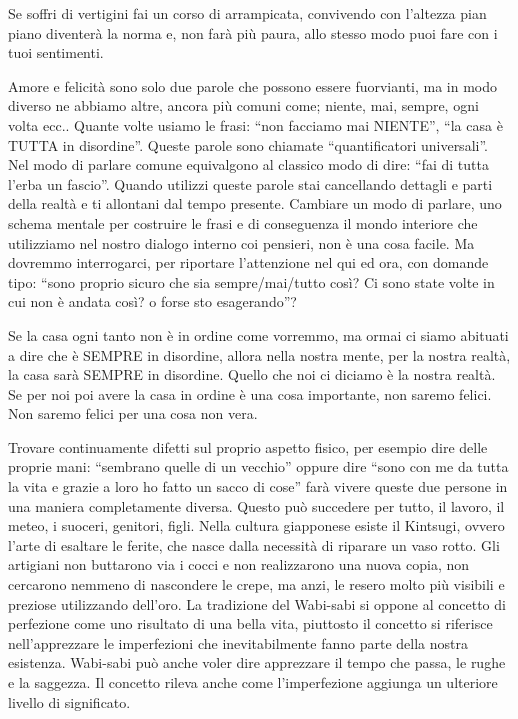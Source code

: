 \documentclass[12pt]{book} %
\begin{document}
Se soffri di vertigini fai un corso di arrampicata, convivendo con l'altezza pian piano diventerà
la norma e, non farà più paura, allo stesso modo puoi fare con i tuoi sentimenti.


\bigskip

Amore e felicità sono solo due parole che possono essere fuorvianti, ma in modo diverso ne abbiamo altre, ancora più
comuni come; niente, mai, sempre, ogni volta ecc.. Quante volte usiamo le frasi: “non facciamo mai NIENTE”, “la casa è
TUTTA in disordine”. Queste parole sono chiamate “quantificatori universali”. Nel modo di parlare comune equivalgono al
classico modo di dire: “fai di tutta l'erba un fascio”. Quando utilizzi queste parole stai
cancellando dettagli e parti della realtà e ti allontani dal tempo presente. Cambiare un modo di parlare, uno schema
mentale per costruire le frasi e di conseguenza il mondo interiore che utilizziamo nel nostro dialogo interno coi
pensieri, non è una cosa facile. Ma dovremmo interrogarci, per riportare l'attenzione nel qui ed ora, con domande tipo:
“sono proprio sicuro che sia sempre/mai/tutto così? Ci sono state volte in cui non è andata così? o forse sto
esagerando”?

Se la casa ogni tanto non è in ordine come vorremmo, ma ormai ci siamo abituati a dire che è SEMPRE in disordine, allora
nella nostra mente, per la nostra realtà, la casa sarà SEMPRE in disordine. Quello che noi ci diciamo è la nostra
realtà. Se per noi poi avere la casa in ordine è una cosa importante, non saremo felici. Non saremo felici per una cosa
non vera.

Trovare continuamente difetti sul proprio aspetto fisico, per esempio dire delle proprie mani: “sembrano quelle di un
vecchio” oppure dire “sono con me da tutta la vita e grazie a loro ho fatto un sacco di cose” farà vivere queste due
persone in una maniera completamente diversa. Questo può succedere per tutto, il lavoro, il meteo, i suoceri, genitori,
figli. Nella cultura giapponese esiste il Kintsugi, ovvero l'arte di esaltare le ferite, che nasce
dalla necessità di riparare un vaso rotto. Gli artigiani non buttarono via i cocci e non realizzarono una nuova copia,
non cercarono nemmeno di nascondere le crepe, ma anzi, le resero molto più visibili e preziose utilizzando
dell'oro. La tradizione del Wabi-sabi si oppone al concetto di perfezione come uno risultato di
una bella vita, piuttosto il concetto si riferisce nell'apprezzare le imperfezioni che
inevitabilmente fanno parte della nostra esistenza. Wabi-sabi può anche voler dire apprezzare il tempo che passa, le
rughe e la saggezza. Il concetto rileva anche come l'imperfezione aggiunga un ulteriore livello di
significato.
\end{document}
